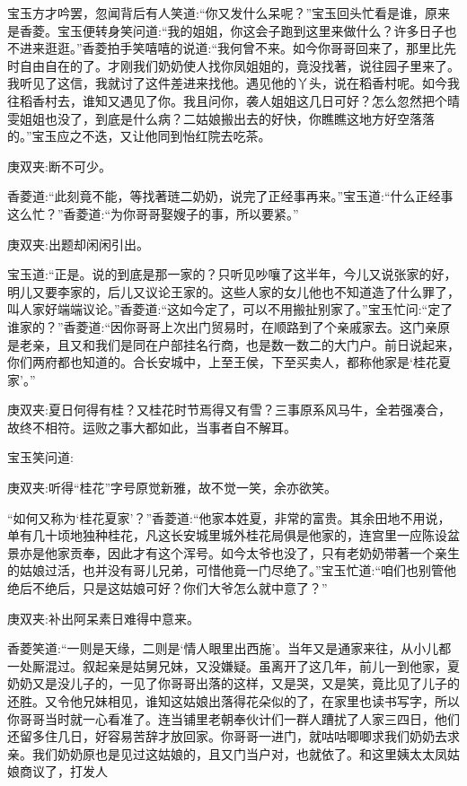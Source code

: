 \begin{parag}
    宝玉方才吟罢，忽闻背后有人笑道:“你又发什么呆呢？”宝玉回头忙看是谁，原来是香菱。宝玉便转身笑问道:“我的姐姐，你这会子跑到这里来做什么？许多日子也不进来逛逛。”香菱拍手笑嘻嘻的说道:“我何曾不来。如今你哥哥回来了，那里比先时自由自在的了。才刚我们奶奶使人找你凤姐姐的，竟没找著，说往园子里来了。我听见了这信，我就讨了这件差进来找他。遇见他的丫头，说在稻香村呢。如今我往稻香村去，谁知又遇见了你。我且问你，袭人姐姐这几日可好？怎么忽然把个晴雯姐姐也没了，到底是什么病？二姑娘搬出去的好快，你瞧瞧这地方好空落落的。”宝玉应之不迭，又让他同到怡红院去吃茶。\begin{note}庚双夹:断不可少。\end{note}香菱道:“此刻竟不能，等找著琏二奶奶，说完了正经事再来。”宝玉道:“什么正经事这么忙？”香菱道:“为你哥哥娶嫂子的事，所以要紧。”\begin{note}庚双夹:出题却闲闲引出。\end{note}宝玉道:“正是。说的到底是那一家的？只听见吵嚷了这半年，今儿又说张家的好，明儿又要李家的，后儿又议论王家的。这些人家的女儿他也不知道造了什么罪了，叫人家好端端议论。”香菱道:“这如今定了，可以不用搬扯别家了。”宝玉忙问:“定了谁家的？”香菱道:“因你哥哥上次出门贸易时，在顺路到了个亲戚家去。这门亲原是老亲，且又和我们是同在户部挂名行商，也是数一数二的大门户。前日说起来，你们两府都也知道的。合长安城中，上至王侯，下至买卖人，都称他家是‘桂花夏家’。”\begin{note}庚双夹:夏日何得有桂？又桂花时节焉得又有雪？三事原系风马牛，全若强凑合，故终不相符。运败之事大都如此，当事者自不解耳。\end{note}宝玉笑问道:\begin{note}庚双夹:听得“桂花”字号原觉新雅，故不觉一笑，余亦欲笑。\end{note}“如何又称为‘桂花夏家’？”香菱道:“他家本姓夏，非常的富贵。其余田地不用说，单有几十顷地独种桂花，凡这长安城里城外桂花局俱是他家的，连宫里一应陈设盆景亦是他家贡奉，因此才有这个浑号。如今太爷也没了，只有老奶奶带著一个亲生的姑娘过活，也并没有哥儿兄弟，可惜他竟一门尽绝了。”宝玉忙道:“咱们也别管他绝后不绝后，只是这姑娘可好？你们大爷怎么就中意了？”\begin{note}庚双夹:补出阿呆素日难得中意来。\end{note}香菱笑道:“一则是天缘，二则是‘情人眼里出西施’。当年又是通家来往，从小儿都一处厮混过。叙起亲是姑舅兄妹，又没嫌疑。虽离开了这几年，前儿一到他家，夏奶奶又是没儿子的，一见了你哥哥出落的这样，又是哭，又是笑，竟比见了儿子的还胜。又令他兄妹相见，谁知这姑娘出落得花朵似的了，在家里也读书写字，所以你哥哥当时就一心看准了。连当铺里老朝奉伙计们一群人蹧扰了人家三四日，他们还留多住几日，好容易苦辞才放回家。你哥哥一进门，就咕咕唧唧求我们奶奶去求亲。我们奶奶原也是见过这姑娘的，且又门当户对，也就依了。和这里姨太太凤姑娘商议了，打发人
\end{parag}
